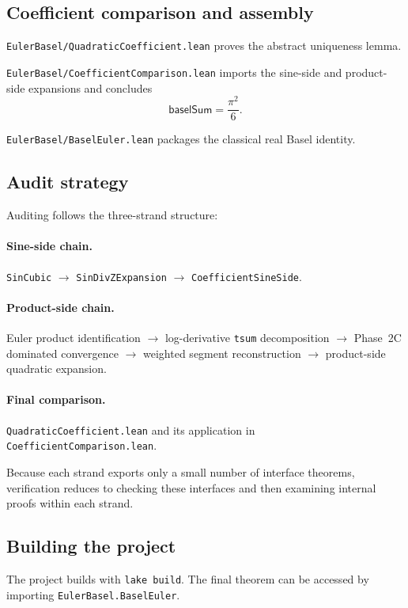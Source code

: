 \documentclass[11pt,a4paper]{article}
\theoremstyle{plain}
\theoremstyle{definition}
\DeclareRobustCommand{\codepath}[1]{\nolinkurl{#1}}
\DeclareRobustCommand{\codepath}[1]{\nolinkurl{#1}}
\newcommand{\baselSum}{\ensuremath{\mathsf{baselSum}}}
\begin{document}
\subsection{Coefficient comparison and assembly}

\texttt{EulerBasel/QuadraticCoefficient.lean}
proves the abstract uniqueness lemma.

\texttt{EulerBasel/CoefficientComparison.lean}
imports the sine-side and product-side expansions and concludes
\[
\baselSum
=
\frac{\pi^{2}}{6}.
\]

\texttt{EulerBasel/BaselEuler.lean}
packages the classical real Basel identity.

\subsection{Audit strategy}

Auditing follows the three-strand structure:

\paragraph{Sine-side chain.}
\texttt{SinCubic}
\(\to\)
\texttt{SinDivZExpansion}
\(\to\)
\texttt{CoefficientSineSide}.

\paragraph{Product-side chain.}
Euler product identification
\(\to\)
log-derivative \texttt{tsum} decomposition
\(\to\)
Phase~2C dominated convergence
\(\to\)
weighted segment reconstruction
\(\to\)
product-side quadratic expansion.

\paragraph{Final comparison.}
\codepath{QuadraticCoefficient.lean}
and its application in
\codepath{CoefficientComparison.lean}.

Because each strand exports only a small number of interface theorems, verification reduces to checking these interfaces and then examining internal proofs within each strand.

\subsection{Building the project}

The project builds with \texttt{lake build}. The final theorem can be accessed by importing
\texttt{EulerBasel.BaselEuler}.
\end{document}
